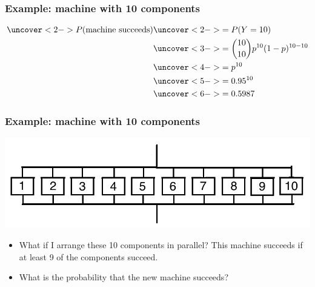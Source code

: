\documentclass[handout]{beamer}\usepackage{graphicx, color}
\numberwithin{equation}{section}
\begin{document}
\begin{frame}
\frametitle{Example: machine with 10 components}
\begin{align*}
\uncover<2->{P(\text{machine succeeds})} &\uncover<2->{= P(Y = 10)} \\
&\uncover<3->{= \binom{10}{10}p^{10} (1-p)^{10 - 10}} \\
&\uncover<4->{= p^{10}} \\
&\uncover<5->{=0.95^{10}} \\
&\uncover<6->{= 0.5987}
\end{align*}
\begin{itemize}
\end{itemize}
\end{frame}

\begin{frame}
\frametitle{Example: machine with 10 components}

\begin{center}
 \includegraphics{../../fig/mach3.png}
\end{center}

\begin{itemize}
\pause \item What if I arrange these 10 components in parallel? This machine succeeds if at least 9 of the components succeed.
\pause \item What is the probability that the new machine succeeds?
\end{itemize}


\end{frame}
\end{document}
